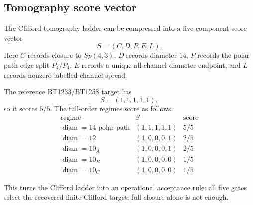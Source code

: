 \subsection{Tomography score vector}
\label{sec:bt1267-tomography-score-vector}

The Clifford tomography ladder can be compressed into a five-component score vector
\[
S=(C,D,P,E,L).
\]
Here \(C\) records closure to \(Sp(4,3)\), \(D\) records diameter \(14\), \(P\) records the polar path edge split \(P_4/P_4\), \(E\) records a unique all-channel diameter endpoint, and \(L\) records nonzero labelled-channel spread.

The reference BT1233/BT1258 target has
\[
S=(1,1,1,1,1),
\]
so it scores \(5/5\).  The full-order regimes score as follows:
\[
\begin{array}{c|c|c}
\text{regime} & S & \text{score}\\
\hline
\operatorname{diam}=14\text{ polar path} & (1,1,1,1,1) & 5/5\\
\operatorname{diam}=12 & (1,0,0,0,1) & 2/5\\
\operatorname{diam}=10_A & (1,0,0,0,1) & 2/5\\
\operatorname{diam}=10_B & (1,0,0,0,0) & 1/5\\
\operatorname{diam}=10_C & (1,0,0,0,0) & 1/5
\end{array}
\]

This turns the Clifford ladder into an operational acceptance rule: all five gates select the recovered finite Clifford target; full closure alone is not enough.
